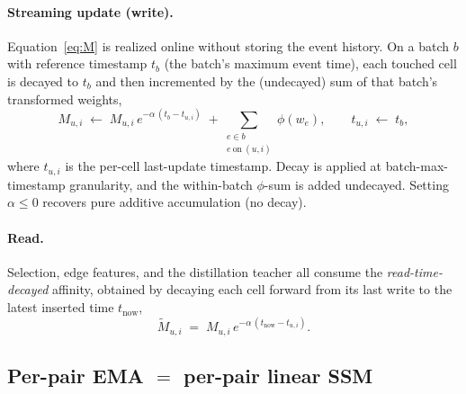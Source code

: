 \documentclass[11pt]{article}
\begin{document}
\paragraph{Streaming update (write).}
Equation~\eqref{eq:M} is realized online without storing the event history. On a
batch $b$ with reference timestamp $t_b$ (the batch's maximum event time), each
touched cell is decayed to $t_b$ and then incremented by the (undecayed) sum of
that batch's transformed weights,
\begin{equation}
M_{u,i} \;\leftarrow\;
M_{u,i}\, e^{-\alpha\,(t_b - t_{u,i})}
\;+\!\!\sum_{\substack{e\in b\\ e\ \text{on}\ (u,i)}}\!\! \phi(w_e),
\qquad
t_{u,i} \;\leftarrow\; t_b,
\label{eq:write}
\end{equation}
where $t_{u,i}$ is the per-cell last-update timestamp. Decay is applied at
batch-max-timestamp granularity, and the within-batch $\phi$-sum is added
undecayed. Setting $\alpha\le 0$ recovers pure additive accumulation (no decay).

\paragraph{Read.}
Selection, edge features, and the distillation teacher all consume the
\emph{read-time-decayed} affinity, obtained by decaying each cell forward from its
last write to the latest inserted time $t_{\text{now}}$,
\begin{equation}
\tilde M_{u,i}
\;=\;
M_{u,i}\, e^{-\alpha\,(t_{\text{now}} - t_{u,i})}.
\label{eq:read}
\end{equation}

\subsection{Per-pair EMA \texorpdfstring{$=$}{=} per-pair linear SSM}
\label{subsec:ssm}
\end{document}

